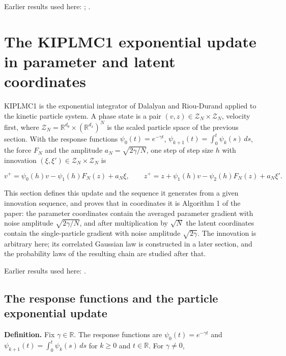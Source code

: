 \documentclass[11pt,a4paper]{report}
\begin{document}
Earlier results used here: \cite[Section~3.1.1]{LangevinLean2026IPLA}; \cite[Section~3.1.4]{LangevinLean2026IPLA}.
\section{\texorpdfstring{The KIPLMC1 exponential update in parameter and latent coordinates}{The KIPLMC1 exponential update in parameter and latent coordinates}}
\label{proof-module-KIPLMC-Exponential-lean}


KIPLMC1 is the exponential integrator of Dalalyan and Riou-Durand applied to the kinetic particle system. A phase state is a pair \((v,z)\in\mathcal Z_N\times\mathcal Z_N\), velocity first, where \(\mathcal Z_N=\mathbb R^{d_\theta}\times(\mathbb R^{d_x})^N\) is the scaled particle space of the previous section. With the response functions \(\psi_0(t)=e^{-\gamma t}\), \(\psi_{k+1}(t)=\int_0^t\psi_k(s)\,ds\), the force \(F_N\) and the amplitude \(a_N=\sqrt{2\gamma/N}\), one step of step size \(h\) with innovation \((\xi,\xi')\in\mathcal Z_N\times\mathcal Z_N\) is


\[v^+=\psi_0(h)v-\psi_1(h)F_N(z)+a_N\xi,\qquad z^+=z+\psi_1(h)v-\psi_2(h)F_N(z)+a_N\xi'.\]


This section defines this update and the sequence it generates from a given innovation sequence, and proves that in coordinates it is Algorithm 1 of the paper: the parameter coordinates contain the averaged parameter gradient with noise amplitude \(\sqrt{2\gamma/N}\), and after multiplication by \(\sqrt N\) the latent coordinates contain the single-particle gradient with noise amplitude \(\sqrt{2\gamma}\). The innovation is arbitrary here; its correlated Gaussian law is constructed in a later section, and the probability laws of the resulting chain are studied after that.



Earlier results used here: \cite[Section~3.12]{LangevinLean2026Kinetic}.
\subsection{\texorpdfstring{The response functions and the particle exponential update}{The response functions and the particle exponential update}}
\label{report-step-KIPLMC-Exponential-lean-1}


\textbf{Definition.} Fix \(\gamma\in\mathbb R\). The response functions are \(\psi_0(t)=e^{-\gamma t}\) and \(\psi_{k+1}(t)=\int_0^t\psi_k(s)\,ds\) for \(k\ge0\) and \(t\in\mathbb R\). For \(\gamma\ne0\),
\end{document}
